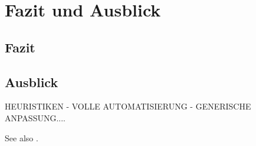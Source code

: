 \chapter{Fazit und Ausblick\label{Chapter6}}
\section{Fazit} 
\section{Ausblick}
HEURISTIKEN - VOLLE AUTOMATISIERUNG - GENERISCHE ANPASSUNG....


See also \cite{dai_automatic_2005}.